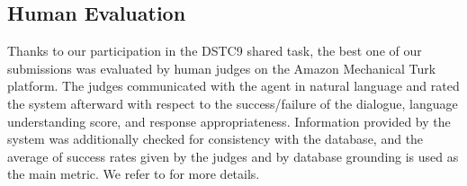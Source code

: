 \documentclass[letterpaper]{article} %
\begin{document}
\subsection{Human Evaluation}

Thanks to our participation in the DSTC9 shared task, the best one of our submissions was evaluated by human judges on the Amazon Mechanical Turk platform. The judges communicated with the agent in natural language and rated the system afterward with respect to the success/failure of the dialogue, language understanding score, and response appropriateness. Information provided by the system was additionally checked for consistency with the database, and the average of success rates given by the judges and by database grounding is used as the main metric.
We refer to \citet{gunasekara2020overview} for more details.
\end{document}
